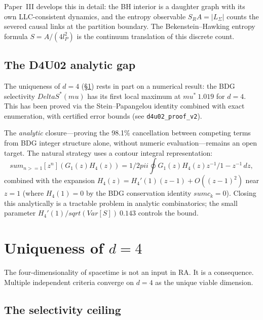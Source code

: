 \documentclass[11pt]{article}
\newcommand{\SRa}{S_{\mathrm{RA}}}
\def\ell{l}%
\def\Delta{Delta}%
\def\mu{mu}%
\def\pi{pi}%
\def\mathrm#1{#1}%
\def\sqrt#1{sqrt(#1)}%
\def\frac#1#2{#1/#2}%
\def\geq{>=}%
\def\approx{~}%
\def\sum{sum}%
\def\SRa{S_RA}%
\begin{document}
Paper~III develops this in detail: the BH interior is a daughter graph with its own LLC-consistent dynamics, and the entropy observable $\SRa = |L_\Sigma|$ counts the severed causal links at the partition boundary. The Bekenstein--Hawking entropy formula $S = A/(4\ell_P^2)$ is the continuum translation of this discrete count.

\subsection{The D4U02 analytic gap}
\label{sec:d4u02_gap}

The uniqueness of $d=4$ (\S\ref{sec:d4}) rests in part on a numerical result: the BDG selectivity $\Delta S^*(\mu)$ has its first local maximum at $\mu^* \approx 1.019$ for $d=4$. This has been proved via the Stein--Papangelou identity combined with exact enumeration, with certified error bounds (see \texttt{d4u02\_proof\_v2}).

The \emph{analytic} closure---proving the 98.1\% cancellation between competing terms from BDG integer structure alone, without numeric evaluation---remains an open target. The natural strategy uses a contour integral representation:
\begin{equation}
\sum_{n \geq 1} [z^n](G_1(z) H_4(z)) = \frac{1}{2\pi i} \oint G_1(z) H_4(z) \frac{z^{-1}}{1 - z^{-1}}\,dz,
\end{equation}
combined with the expansion $H_4(z) = H_4'(1)(z-1) + O((z-1)^2)$ near $z = 1$ (where $H_4(1) = 0$ by the BDG conservation identity $\sum c_k = 0$). Closing this analytically is a tractable problem in analytic combinatorics; the small parameter $H_4'(1)/\sqrt{\mathrm{Var}[S]} \approx 0.143$ controls the bound.

\section{Uniqueness of $d=4$}
\label{sec:d4}

The four-dimensionality of spacetime is not an input in RA. It is a consequence. Multiple independent criteria converge on $d=4$ as the unique viable dimension.

\subsection{The selectivity ceiling}
\end{document}
